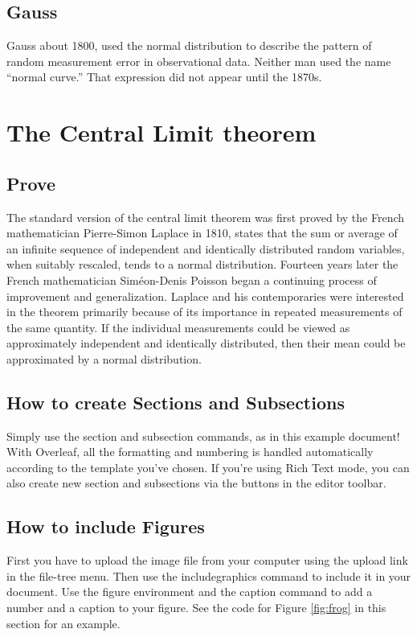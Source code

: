 \documentclass{article}
\begin{document}
\subsection{Gauss}
Gauss about 1800, used the normal distribution to describe the pattern of random
measurement error in observational data. Neither man used the name “normal curve.” That expression did not appear until the 1870s.
\section{The Central Limit theorem }
\subsection{Prove}
The standard version of the central limit theorem was first proved by the French mathematician Pierre-Simon Laplace in 1810, states that the sum or average of an infinite sequence of independent and identically distributed random variables, when suitably rescaled, tends to a normal distribution.
Fourteen years later the French mathematician Siméon-Denis Poisson began a continuing process of improvement and generalization.
Laplace and his contemporaries were interested in the theorem primarily because of its importance in repeated measurements of the same quantity. If the individual measurements could be viewed as approximately independent and identically distributed, then their mean could be approximated by a normal distribution.
\subsection{How to create Sections and Subsections}

Simply use the section and subsection commands, as in this example document! With Overleaf, all the formatting and numbering is handled automatically according to the template you've chosen. If you're using Rich Text mode, you can also create new section and subsections via the buttons in the editor toolbar.

\subsection{How to include Figures}

First you have to upload the image file from your computer using the upload link in the file-tree menu. Then use the includegraphics command to include it in your document. Use the figure environment and the caption command to add a number and a caption to your figure. See the code for Figure \ref{fig:frog} in this section for an example.
\end{document}
